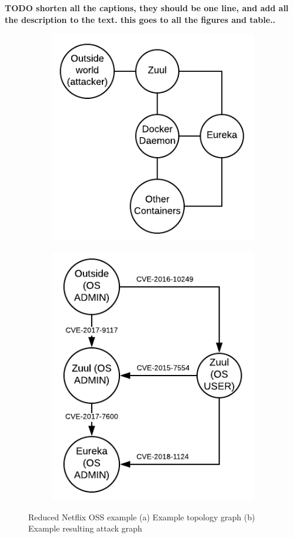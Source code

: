 \textbf{TODO shorten all the captions, they should be one line, and add all the description to the text. this goes to all the figures and table..}\\
\begin{figure}[!h]
	\centering
	\begin{subfigure}[b]{\columnwidth}
		\centering
		\includegraphics[width=.5\linewidth]{./images/Topology_graph}
		\caption{}
		\label{TopologyGraph}
	\end{subfigure}
	\hfill
	\begin{subfigure}[b]{\columnwidth}
		\centering
		\includegraphics[width=.5\linewidth]{./images/Attack_graph}
		\caption{}
		\label{AttackGraph}
	\end{subfigure}
	
	\caption[Two numerical solutions]{Reduced Netflix OSS example (a) Example topology graph  (b) Example resulting attack graph}
\end{figure}


